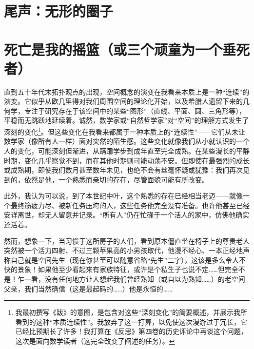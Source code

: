 
\section*{尾声：无形的圈子}
\section{死亡是我的摇篮（或三个顽童为一个垂死者）}

直到五十年代末拓扑观点的出现，空间概念的演变在我看来本质上是一种“连续”的演变。它似乎从欧几里得对我们周围空间的理论化开始，以及希腊人遗留下来的几何学，专注于研究存在于该空间中的某些“图形”（直线、平面、圆、三角形等），平稳而无跳跃地延续着。诚然，数学家或“自然哲学家”对“空间”的理解方式发生了深刻的变化\footnote{我最初撰写《跋》的意图，是包含对这些“深刻变化”的简要概述，并展示我所看到的这种“本质连续性”。我放弃了这一打算，以免使这次漫游过于冗长，它已经比预期长了许多！我打算在《反思》第四卷的历史评论中再谈这个问题，这次是面向数学读者（这完全改变了阐述的任务）。}。但这些变化在我看来都属于一种本质上的“连续性”——它们从未让数学家（像所有人一样）面对突然的陌生感。这些变化就像我们从小就认识的一个人的变化，可能深刻但渐进，从蹒跚学步到成年直至完全成熟。在某些漫长的平静时期，变化几乎察觉不到，而在其他时期则可能动荡不安。但即使在最强烈的成长或成熟期，即使我们数月甚至数年未见，也绝不会有丝毫怀疑或犹豫：我们再次见到的，依然是他，一个熟悉而亲切的存在，尽管面貌可能有所改变。

此外，我认为可以说，到了本世纪中叶，这个熟悉的存在已经相当老迈——就像一个最终筋疲力尽、被新任务压垮的人，这些任务他完全没有准备。也许他甚至已经安详离世，却无人留意并记录。“所有人”仍在忙碌于一个活人的家中，仿佛他确实还活着。

然而，想象一下，当习惯于这所房子的人们，看到原本僵直坐在椅子上的尊贵老人突然被一个活力四射、不过三颗苹果高的小男孩取代，他漫不经心、一本正经地声称自己就是空间先生（现在你甚至可以随意省略“先生”二字），这该是多么令人不快的景象！如果他至少看起来有家族特征，或许是个私生子也说不定……但完全不是！乍一看，没有任何地方让人想起我们曾经熟知（或自以为熟知……）的老空间父亲，我们当然确信（这是最起码的……）他是永恒的……

